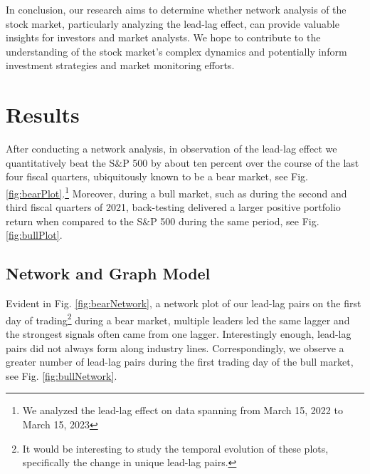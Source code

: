 \documentclass{article}
\begin{document}
In conclusion, our research aims to determine whether network analysis of the stock market, particularly analyzing the lead-lag effect, can provide valuable insights for investors and market analysts. We hope to contribute to the understanding of the stock market's complex dynamics and potentially inform investment strategies and market monitoring efforts.
\section{Results}
After conducting a network analysis, in observation of the lead-lag effect we quantitatively beat the S$\&$P 500 by about ten percent over the course of the last four fiscal quarters, ubiquitously known to be a bear market, see Fig. \ref{fig:bearPlot}.\footnote{We analyzed the lead-lag effect on data spanning from March 15, 2022 to March 15, 2023} Moreover, during a bull market, such as during the second and third fiscal quarters of 2021, back-testing delivered a larger positive portfolio return when compared to the S$\&$P 500 during the same period, see Fig. \ref{fig:bullPlot}.
\subsection{Network and Graph Model}
Evident in Fig. \ref{fig:bearNetwork}, a network plot of our lead-lag pairs on the first day of trading\footnote{It would be interesting to study the temporal evolution of these plots, specifically the change in unique lead-lag pairs.} during a bear market, multiple leaders led the same lagger and the strongest signals often came from one lagger. Interestingly enough, lead-lag pairs did not always form along industry lines. Correspondingly, we observe a greater number of lead-lag pairs during the first trading day of the bull market, see Fig. \ref{fig:bullNetwork}.
\end{document}
